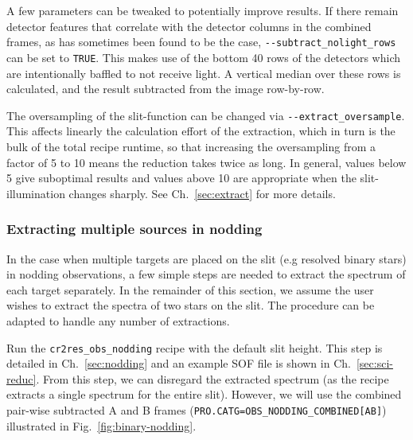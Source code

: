 A few parameters can be tweaked to potentially improve results. If there remain
detector features that correlate with the detector columns in the combined
frames, as has sometimes been found to be the case,
\verb!--subtract_nolight_rows! can be set to \verb!TRUE!. This makes use of the
bottom 40 rows of the detectors which are intentionally baffled to not receive
light. A vertical median over these rows is calculated, and the result subtracted
from the image row-by-row.

The oversampling of the slit-function can be changed via
\verb!--extract_oversample!. This affects linearly the calculation effort of the
extraction, which in turn is the bulk of the total recipe runtime, so that
increasing the oversampling from a factor of 5 to 10 means the reduction takes
twice as long. In general, values below 5 give suboptimal results and values
above 10 are appropriate when the slit-illumination changes sharply. See
Ch.~\ref{sec:extract} for more details.

\subsubsection{Extracting multiple sources in nodding}
In the case when multiple targets are placed on the slit (e.g resolved binary
stars) in nodding observations, a few simple steps are needed to extract the spectrum 
of each target separately. In the remainder of this section, we assume the user 
wishes to extract the spectra of two stars on the slit. The procedure can be 
adapted to handle any number of extractions.
 
Run the \verb!cr2res_obs_nodding! recipe with the default slit height.
This step is detailed in Ch.~\ref{sec:nodding} and an example SOF file is
shown in Ch.~\ref{sec:sci-reduc}.
From this step, we can disregard the extracted spectrum (as the recipe extracts
a single spectrum for the entire slit). However, we will use the combined
pair-wise subtracted A and B frames (\verb!PRO.CATG=OBS_NODDING_COMBINED[AB]!)
 illustrated in Fig.~\ref{fig:binary-nodding}.

\begin{shell}[fontsize=\small]
\end{shell}

